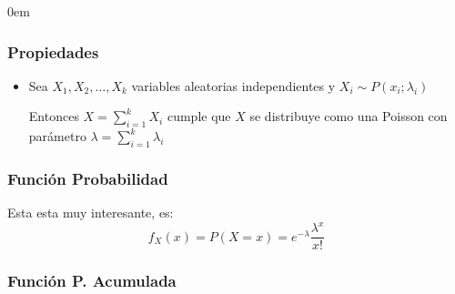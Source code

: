 \documentclass[12pt, fleqn]{report}                             %
\newenvironment{SmallIndentation}[1][0.75em]                    %
        {\begin{adjustwidth}{#1}{}\begin{footnotesize}}             %
        {\end{footnotesize}\end{adjustwidth}}                       %
\newcommand \ForceColumnBreak   {\vfill\null\columnbreak}       %
\theoremstyle{break}                                            %
\begin{document}
\begin{multicols}{2}
\begin{SmallIndentation}[0em]
                    \subsubsection{Propiedades}

                        \begin{itemize}
                            
                            \item 
                                Sea $X_1, X_2, \dots, X_k$ variables aleatorias independientes
                                y $X_i \sim P(x_i; \lambda_i)$ 

                                Entonces $X = \sum_{i = 1}^k X_i$ cumple que $X$ se distribuye como
                                una Poisson con parámetro $\lambda = \sum_{i=1}^k \lambda_i$

                        \end{itemize}


                    \ForceColumnBreak


                    \subsubsection{Función Probabilidad}

                        Esta esta muy interesante, es:
                        \begin{equation*}
                            f_X(x) = P(X = x) = e^{- \lambda} \dfrac{\lambda^x}{x!}
                        \end{equation*}


                    \subsubsection{Función P. Acumulada}


\end{SmallIndentation}
\end{multicols}
\end{document}
